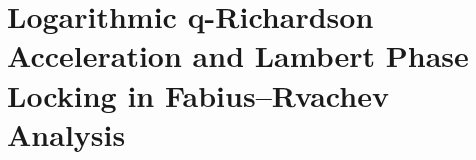 \documentclass[11pt]{article}
\makeatletter
\numberwithin{equation}{section}
\let\frontier@normal@H@refstepcounter\H@refstepcounter
\let\frontier@normal@Hy@chapapp\Hy@chapapp
\newcommand{\frontierreportpart}[1]{%
  \clearpage
  \let\H@refstepcounter\frontier@normal@H@refstepcounter
  \let\Hy@chapapp\frontier@normal@Hy@chapapp
  \gdef\theHsection{\arabic{part}.\arabic{section}}%
  \setcounter{section}{0}%
  \renewcommand{\thesection}{\arabic{section}}%
  \part{#1}}
\theoremstyle{definition}
\theoremstyle{remark}
\makeatother
\begin{document}
\newcommand{\sgnPartll}{\operatorname{sgn}}
\newcommand{\ddPartll}{\,\mathrm{d}}
\newcommand{\ePartll}{\mathrm{e}}
\newcommand{\iiPartll}{\mathrm{i}}
\newcommand{\RPartll}{\mathbb{R}}
\newcommand{\CPartll}{\mathbb{C}}
\newcommand{\NPartll}{\mathbb{N}}
\newcommand{\ZPartll}{\mathbb{Z}}
\newcommand{\QPartll}{\mathbb{Q}}
\newcommand{\absPartll}[1]{\left\lvert #1\right\rvert}
\newcommand{\brak}[2]{\genfrac{[}{]}{0pt}{}{#1}{#2}}
\newcommand{\poch}[2]{(#1;#2)}
\newcommand{\lambert}{W_{-1}}
\newcommand{\repoPartll}{\textsc{ProveIt}}
\newcommand{\statusprovedPartll}{\textcolor{darkgreen}{\textbf{proved here}}}
\newcommand{\statusconditional}{\textcolor{linkblue}{\textbf{proved conditionally on the repository's all-orders expansion}}}
\newcommand{\statusopenPartll}{\textcolor{darkred}{\textbf{open}}}
\newtheorem{observation}[theorem]{Observation}

\frontierreportpart{Logarithmic q-Richardson Acceleration and Lambert Phase
Locking in Fabius--Rvachev Analysis}


\clearpage
\end{document}
